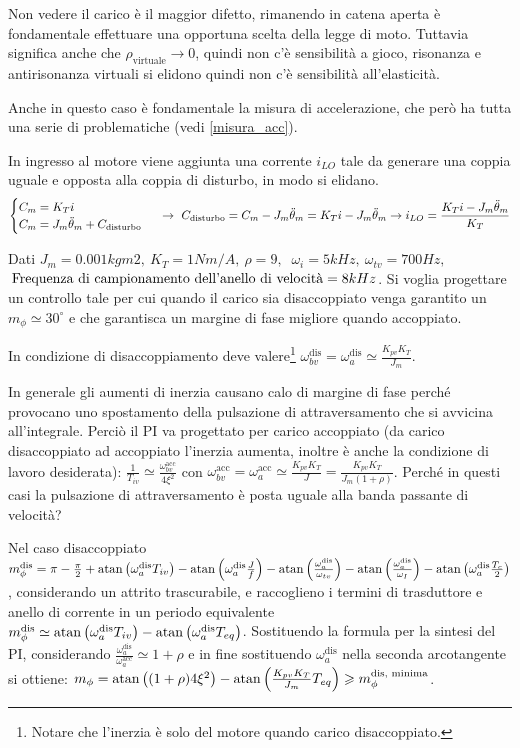 Non vedere il carico è il maggior difetto, rimanendo in catena aperta è fondamentale effettuare una opportuna scelta della legge di moto.
Tuttavia significa anche che \(\rho_\text{virtuale} \rightarrow 0\), quindi non c'è sensibilità a gioco, risonanza e antirisonanza virtuali si elidono quindi non c'è sensibilità all'elasticità.

Anche in questo caso è fondamentale la misura di accelerazione, che però ha tutta una serie di problematiche (vedi \ref{misura_acc}).

In ingresso al motore viene aggiunta una corrente \(i_{LO}\) tale da generare una coppia uguale e opposta alla coppia di disturbo, in modo si elidano.
\[\begin{cases}
    C_m = K_T i \\
    C_m = J_m \Ddot{\theta}_m + C_\text{disturbo}
\end{cases} \ \rightarrow \ C_\text{disturbo} = C_m - J_m \Ddot{\theta}_m = K_T i - J_m \Ddot{\theta}_m \rightarrow i_{LO} = \frac{K_T i - J_m \Ddot{\theta}_m}{K_T} \]  

Dati \(J_m=0.001 kgm2, \ K_T=1 Nm/A, \ \rho = 9, \) \( \ \omega_i = 5 kHz, \ \omega_{tv}=700 Hz, \) \( \, \text{Frequenza di campionamento \allowbreak dell’anello di velocità} = 8 kHz\).
Si voglia progettare un controllo tale per cui quando il carico sia disaccoppiato venga garantito un \(m_\phi \simeq 30^\circ\) e che garantisca un margine di fase migliore quando accoppiato.

In condizione di disaccoppiamento deve valere\footnote{Notare che l'inerzia è solo del motore quando carico disaccoppiato.} \(\omega_{bv}^\text{dis} = \omega_a^\text{dis} \simeq \frac{K_{pv}K_T}{J_m}\).

In generale gli aumenti di inerzia causano calo di margine di fase perché provocano uno spostamento della pulsazione di attraversamento che si avvicina all'integrale. Perciò il PI va progettato per carico accoppiato (da carico disaccoppiato ad accoppiato l'inerzia aumenta, inoltre è anche la condizione di lavoro desiderata): \(\frac{1}{T_{iv}} \simeq \frac{\omega_{bv}^\text{acc}}{4\xi^2}\) con \(\omega_{bv}^\text{acc} = \omega_{a}^\text{acc} \simeq \frac{K_{pv}K_T}{J} = \frac{K_{pv}K_T}{J_m (1+\rho)}\). {\color{red} Perché in questi casi la pulsazione di attraversamento è posta uguale alla banda passante di velocità?}

Nel caso disaccoppiato \(m_\phi^\text{dis} = \pi - \frac{\pi}{2} + \operatorname{atan}\left( \omega_a^\text{dis} T_{iv} \right) - \operatorname{atan}\left( \omega_a^\text{dis} \frac{J}{f} \right) - \operatorname{atan}\left( \frac{\omega_a^\text{dis}}{\omega_{tv}} \right) - \operatorname{atan}\left( \frac{\omega_a^\text{dis}}{\omega_I} \right) - \operatorname{atan}\left( \omega_a^\text{dis} \frac{T_c}{2} \right) \), considerando un attrito trascurabile, e raccoglieno i termini di trasduttore e anello di corrente in un periodo equivalente \(m_\phi^\text{dis} \simeq \operatorname{atan}\left( \omega_a^\text{dis} T_{iv} \right) - \operatorname{atan}\left( \omega_a^\text{dis} T_{eq} \right) \). Sostituendo la formula per la sintesi del PI, considerando \(\frac{\omega_a^\text{dis}}{\omega_a^\text{acc}} \simeq 1+\rho\) e in fine sostituendo \(\omega_a^\text{dis}\) nella seconda arcotangente si ottiene: \(m_\phi = \operatorname{atan}\left( (1+\rho) 4 \xi^2 \right) - \operatorname{atan}\left( \frac{K_{pv}K_T}{J_m} T_{eq} \right) \geqslant m_\phi^\text{dis, minima}\).

